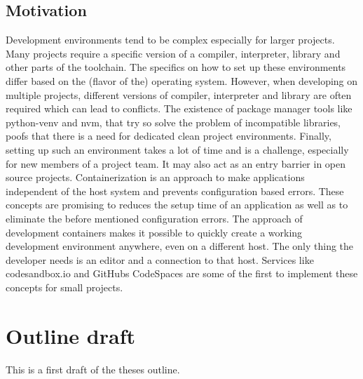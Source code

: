 \documentclass[12pt, a4paper]{article}
\begin{document}
\subsection{Motivation}
Development environments tend to be complex especially for larger projects. Many projects require a specific version of a compiler, interpreter, library and other parts of the toolchain. The specifics on how to set up these environments differ based on the (flavor of the) operating system. However, when developing on multiple projects, different versions of compiler, interpreter and library are often required which can lead to conflicts. The existence of package manager tools like \ac*{python-venv} and \ac{nvm}, that try so solve the problem of incompatible libraries, poofs that there is a need for dedicated clean project environments.\newline
Finally, setting up such an environment takes a lot of time and is a challenge, especially for new members of a project team. It may also act as an entry barrier in open source projects.\newline
Containerization is an approach to make applications independent of the host system and prevents configuration based errors. These concepts are promising to reduces the setup time of an application as well as to eliminate the before mentioned configuration errors. The approach of development containers makes it possible to quickly create a working development environment anywhere, even on a different host. The only thing the developer needs is an editor and a connection to that host. Services like codesandbox.io and GitHubs CodeSpaces are some of the first to implement these concepts for small projects.
\newpage
\section{Outline draft}
This is a first draft of the theses outline.
\end{document}
